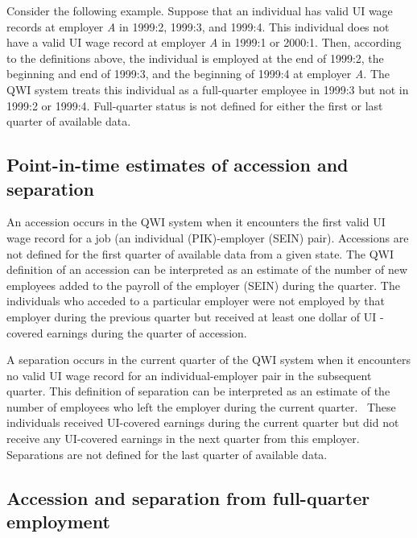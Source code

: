 Consider the following example. Suppose that an individual has
valid {UI} wage records at employer \textit{A} in 1999:2, 1999:3, and
1999:4. This individual does not have a valid {UI} wage record at
employer \textit{A} in 1999:1 or 2000:1. Then, according to the definitions
above, the individual is employed at the end of 1999:2, the beginning and
end of 1999:3, and the beginning of 1999:4 at employer \textit{A}. The QWI
system treats this individual as a full-quarter employee in 1999:3 but not
in 1999:2 or 1999:4. Full-quarter status is not defined for either the first
or last quarter of available data.

\subsection{Point-in-time estimates of accession and separation}

 

An accession occurs in the QWI system when it encounters the first valid %
UI wage record for a job (an individual (PIK)-employer
(SEIN) pair). Accessions are not defined for the first quarter
of available data from a given state. The QWI definition of an accession
can be interpreted as an estimate of the number of new employees added to
the payroll of the employer ({SEIN}) during the quarter. The individuals
who acceded to a particular employer were not employed by that employer
during the previous quarter but received at least one dollar of {UI}%
-covered earnings during the quarter of accession.

A separation occurs in the current quarter of the QWI system when it
encounters no valid {UI} wage record for an individual-employer pair
in the subsequent quarter. This definition of separation can be interpreted
as an estimate of the number of employees who left the employer during the
current quarter. \ These individuals received {UI}-covered earnings
during the current quarter but did not receive any {UI}-covered
earnings in the next quarter from this employer. Separations are not defined
for the last quarter of available data.

\subsection{Accession and separation from full-quarter employment}

 

